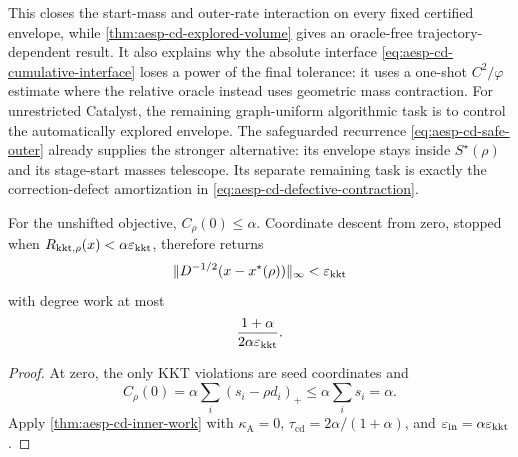 This closes the start-mass and outer-rate interaction on every fixed certified
envelope, while \cref{thm:aesp-cd-explored-volume} gives an oracle-free
trajectory-dependent result.  It also explains why the absolute interface
\cref{eq:aesp-cd-cumulative-interface} loses a power of the final tolerance:
it uses a one-shot $C^2/\varphi$ estimate where the relative oracle instead
uses geometric mass contraction.  For unrestricted Catalyst, the remaining
graph-uniform algorithmic task is to control the automatically explored
envelope.  The safeguarded recurrence \cref{eq:aesp-cd-safe-outer} already
supplies the stronger alternative: its envelope stays inside
$S^\star(\rho)$ and its stage-start masses telescope.  Its separate remaining
task is exactly the correction-defect amortization in
\cref{eq:aesp-cd-defective-contraction}.

\begin{corollary}
\label{cor:aesp-cd-zero-start}
For the unshifted objective, $C_\rho(0)\leq\alpha$.  Coordinate descent from
zero, stopped when $R_{\mathrm{kkt},\rho}(x)<\alpha\varepsilon_{\mathrm{kkt}}$, therefore
returns
\begin{equation*}
 \lVert D^{-1/2}(x-x^\star(\rho))\rVert_\infty<\varepsilon_{\mathrm{kkt}}
\end{equation*}
with degree work at most
\begin{equation}
 \frac{1+\alpha}{2\alpha\varepsilon_{\mathrm{kkt}}}.
 \label{eq:aesp-cd-zero-start-work}
\end{equation}
\end{corollary}

\begin{proof}
At zero, the only KKT violations are seed coordinates and
\begin{equation*}
 C_\rho(0)
 =\alpha\sum_i(s_i-\rho d_i)_+
 \leq\alpha\sum_i s_i=\alpha.
\end{equation*}
Apply \cref{thm:aesp-cd-inner-work} with $\kappa_{\mathrm A}=0$,
$\tau_{\mathrm{cd}}=2\alpha/(1+\alpha)$, and
$\varepsilon_{\mathrm{in}}=\alpha\varepsilon_{\mathrm{kkt}}$.
\end{proof}
